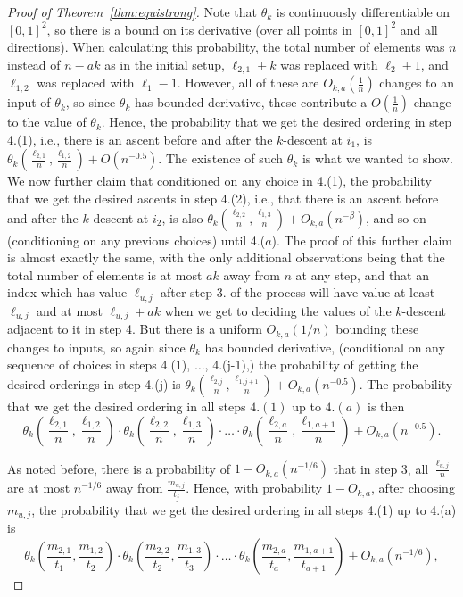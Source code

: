 \documentclass{amsart}
\theoremstyle{definition}
\begin{document}
\begin{proof}[Proof of Theorem~\ref{thm:equistrong}]
Note that $\theta_k$ is continuously differentiable on $[0,1]^2$, so there is a bound on its derivative (over all points in $[0,1]^2$ and all directions). When calculating this probability, the total number of elements was $n$ instead of $n-ak$ as in the initial setup, $\ell_{2,1}+k$ was replaced with $\ell_2+1$, and $\ell_{1,2}$ was replaced with $\ell_1-1$. However, all of these are $O_{k,a}\left(\frac{1}{n}\right)$ changes to an input of $\theta_k$, so since $\theta_k$ has bounded derivative, these contribute a $O\left(\frac{1}{n}\right)$ change to the value of $\theta_k$. Hence, the probability that we get the desired ordering in step 4.(1), i.e., there is an ascent before and after the $k$-descent at $i_1$, is $\theta_k\left(\frac{\ell_{2,1}}{n},\frac{\ell_{1,2}}{n}\right)+O\left(n^{-0.5}\right)$. The existence of such $\theta_k$ is what we wanted to show. We now further claim that conditioned on any choice in 4.(1), the probability that we get the desired ascents in step 4.(2), i.e., that there is an ascent before and after the $k$-descent at $i_2$, is also $\theta_k\left(\frac{\ell_{2,2}}{n},\frac{\ell_{1,3}}{n}\right)+O_{k,a}\left(n^{-\beta}\right)$, and so on (conditioning on any previous choices) until 4.($a$). The proof of this further claim is almost exactly the same, with the only additional observations being that the total number of elements is at most $ak$ away from $n$ at any step, and that an index which has value $\ell_{u,j}$ after step 3. of the process will have value at least $\ell_{u,j}$ and at most $\ell_{u,j}+ak$ when we get to deciding the values of the $k$-descent adjacent to it in step 4. But there is a uniform $O_{k,a}\left(1/n\right)$ bounding these changes to inputs, so again since $\theta_k$ has bounded derivative, (conditional on any sequence of choices in steps 4.(1), $\ldots$, 4.(j-1),) the probability of getting the desired orderings in step 4.(j) is $\theta_k\left(\frac{\ell_{2,j}}{n},\frac{\ell_{1,j+1}}{n}\right)+O_{k,a}\left(n^{-0.5}\right)$. The probability that we get the desired ordering in all steps $4.(1)$ up to $4.(a)$ is then
\[\theta_k\left(\frac{\ell_{2,1}}{n},\frac{\ell_{1,2}}{n}\right)\cdot\theta_k\left(\frac{\ell_{2,2}}{n},\frac{\ell_{1,3}}{n}\right)\cdot \ldots \cdot \theta_k\left(\frac{\ell_{2,a}}{n},\frac{\ell_{1,a+1}}{n}\right)+O_{k,a}\left(n^{-0.5}\right).\]

As noted before, there is a probability of $1-O_{k,a}\left(n^{-1/6}\right)$ that in step 3, all $\frac{\ell_{u,j}}{n}$ are at most $n^{-1/6}$ away from $\frac{m_{u,j}}{t_j}$. Hence, with probability $1-O_{k,a}$, after choosing $m_{u,j}$, the probability that we get the desired ordering in all steps 4.(1) up to 4.(a) is
\[\theta_k\left(\frac{m_{2,1}}{t_1},\frac{m_{1,2}}{t_2}\right)\cdot\theta_k\left(\frac{m_{2,2}}{t_2},\frac{m_{1,3}}{t_3}\right)\cdot \ldots \cdot \theta_k\left(\frac{m_{2,a}}{t_a},\frac{m_{1,a+1}}{t_{a+1}}\right)+O_{k,a}\left(n^{-1/6}\right),\]


\end{proof}
\end{document}
